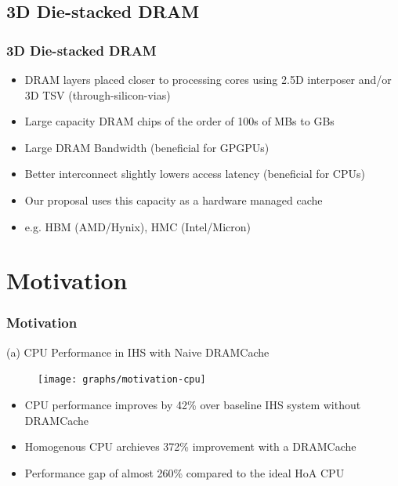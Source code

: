 \documentclass{beamer}
\begin{document}
\subsection{3D Die-stacked DRAM} 

\begin{frame}
\frametitle{3D Die-stacked DRAM}
\begin{itemize}
\item DRAM layers placed closer to processing cores using 2.5D interposer and/or 3D TSV (through-silicon-vias)
\item Large capacity DRAM chips of the order of 100s of MBs to GBs
\item Large DRAM Bandwidth (beneficial for GPGPUs)
\item Better interconnect slightly lowers access latency (beneficial for CPUs)
\item Our proposal uses this capacity as a hardware managed cache
\item e.g. HBM (AMD/Hynix), HMC (Intel/Micron)
\end{itemize}
\begin{figure}[!htb]
	\centering
	\def\svgwidth{0.7\columnwidth}
	
	\label{fig:stacked-dram}
\end{figure}
\end{frame}

\section{Motivation}

\begin{frame}
\frametitle{Motivation}
(a) CPU Performance in IHS with Naive DRAMCache
    \begin{figure}
    	\texttt{[image: graphs/motivation-cpu]}
    \end{figure}
\begin{itemize}
\item CPU performance improves by 42\% over baseline IHS system without DRAMCache
\item Homogenous CPU archieves 372\% improvement with a DRAMCache
\item Performance gap of almost 260\%  compared to the ideal HoA CPU
\end{itemize} 
\end{frame} 
  
\end{document}
